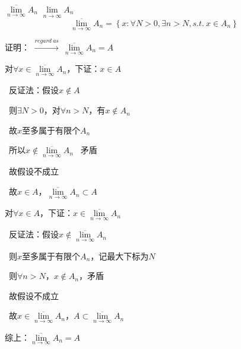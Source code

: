 \begin{td}
$\overline{\lim \limits_{n \to \infty}}A_{n}$
$\lim \limits_{\overline{n \to \infty}}A_{n}$
\[\overline{\lim \limits_{n \to \infty}}A_{n} = \left\{x : \forall N > 0,\exists n > N,s.t. \ x \in A_{n}\right\} \]    
\end{td}
\noindent 证明：
$\xrightarrow{regard \ as} \ \overline{\lim \limits_{n \to \infty}}A_{n} = A$
\par {}对$\forall x \in \overline{\lim \limits_{n \to \infty}}A_{n}$，下证：$x \in A$
\par \ 反证法：假设$x \notin A$
\par \quad \quad \quad \quad \ 则$\exists N > 0$，对$\forall n > N$，有$x \notin A_{n}$
\par \quad \quad \quad \quad \ 故$x$至多属于有限个$A_{n}$
\par \quad \quad \quad \quad \ 所以$x \notin \overline{\lim \limits_{n \to \infty}}A_{n} $ \ 矛盾
\par \quad \quad \quad \quad \ 故假设不成立
\par \quad \quad \quad \quad \ 故$x \in A$，$\overline{\lim \limits_{n \to \infty}}A_{n} \subset A$
\par {}对$\forall x \in A$，下证：$x \in \overline{\lim \limits_{n \to \infty}}A_{n}$
\par \ 反证法：假设$x \notin \overline{\lim \limits_{n \to \infty}}A_{n}$
\par \quad \quad \quad \quad \ 则$x$至多属于有限个$A_{n}$，记最大下标为$N$
\par \quad \quad \quad \quad \ 则$\forall n > N$，$x \notin A_{n}$，矛盾
\par \quad \quad \quad \quad \ 故假设不成立
\par \quad \quad \quad \quad \ 故$x \in \overline{\lim \limits_{n \to \infty}}A_{n}$，$A \subset \overline{\lim \limits_{n \to \infty}}A_{n}$
\par 综上：$\overline{\lim \limits_{n \to \infty}}A_{n} = A$
\\ \hspace*{\fill}\\

